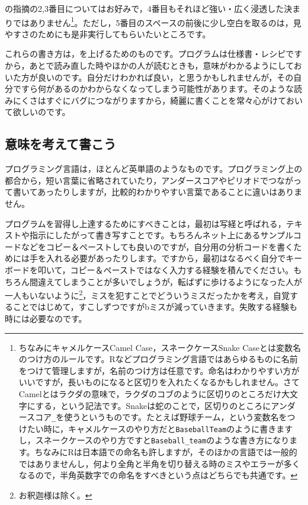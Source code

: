 \documentclass{ltjsbook}
\begin{document}
\textcite{Matsuura201610}の指摘の2,3番目についてはお好みで，4番目もそれほど強い・広く浸透した決まりではありません\footnote{ちなみにキャメルケースCamel Case，スネークケースSnake Caseとは変数名のつけ方のルールです。Rなどプログラミング言語ではあらゆるものに名前をつけて管理しますが，名前のつけ方は任意です。命名はわかりやすい方がいいですが，長いものになると区切りを入れたくなるかもしれません。さてCamelとはラクダの意味で，ラクダのコブのように区切りのところだけ大文字にする，という記法です。Snakeは蛇のことで，区切りのところにアンダースコア\verb|_|を使うというものです。たとえば野球チーム，という変数名をつけたい時に，キャメルケースのやり方だと\texttt{BaseballTeam}のように書きますし，スネークケースのやり方ですと\verb|Baseball_team|のような書き方になります。ちなみにRは日本語での命名も許しますが，そのほかの言語では一般的ではありませんし，何より全角と半角を切り替える時のミスやエラーが多くなるので，半角英数字での命名をすべきという点はどちらでも共通です。}。ただし，5番目のスペースの前後に少し空白を取るのは，見やすさのためにも是非実行してもらいたいところです。

これらの書き方は，を上げるためのものです。プログラムは仕様書・レシピですから，あとで読み直した時やほかの人が読むときも，意味がわかるようにしておいた方が良いのです。自分だけわかれば良い，と思うかもしれませんが，その自分ですら何があるのかわからなくなってしまう可能性があります。そのような読みにくさはすぐにバグにつながりますから，綺麗に書くことを常々心がけておいて欲しいのです。

\subsection{意味を考えて書こう}
プログラミング言語は，ほとんど英単語のようなものです。プログラミング上の都合から，短い言葉に省略されていたり，アンダースコアやピリオドでつながって書いてあったりしますが，比較的わかりやすい言葉であることに違いはありません。

プログラムを習得し上達するためにすべきことは，最初は写経と呼ばれる，テキストや指示にしたがって書き写すことです。もちろんネット上にあるサンプルコードなどをコピー＆ペーストしても良いのですが，自分用の分析コードを書くためには手を入れる必要があったりします。ですから，最初はなるべく自分でキーボードを叩いて，コピー＆ペーストではなく入力する経験を積んでください。もちろん間違えてしまうことが多いでしょうが，転ばずに歩けるようになった人が一人もいないように\footnote{お釈迦様は除く。}，ミスを犯すことでどういうミスだったかを考え，自覚することではじめて，すこしずつですがbミスが減っていきます。失敗する経験も時には必要なのです。
\end{document}
